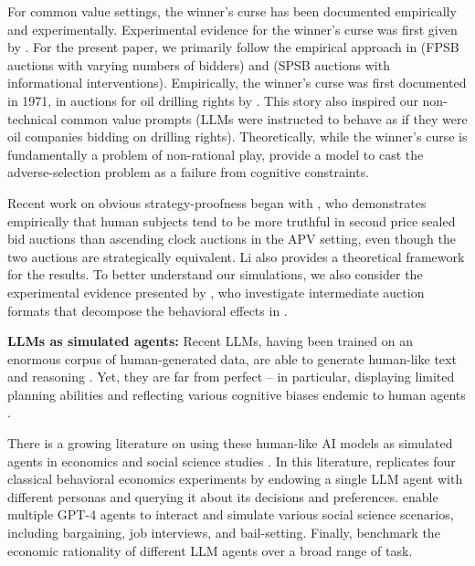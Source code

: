 \documentclass{article} %
\begin{document}
For common value settings, the winner's curse has been documented empirically and experimentally. Experimental evidence for the winner's curse was first given by \citet{bazerman1983won}. For the present paper, we primarily follow the empirical approach in \citet{kagel1986winner} (FPSB auctions with varying numbers of bidders) and \citet{kagel1987information} (SPSB auctions with informational interventions). Empirically, the winner's curse was first documented in 1971, in auctions for oil drilling rights by \cite{capen1971competitive}. This story also inspired our non-technical common value prompts (LLMs were instructed to behave as if they were oil companies bidding on drilling rights). Theoretically, while the winner's curse is fundamentally a problem of non-rational play,  \citet{charness2009origin} provide a model to cast the adverse-selection problem as a failure from cognitive constraints. 


Recent work on obvious strategy-proofness began with \citet{li2017obviously}, who demonstrates empirically that human subjects tend to be more truthful in second price sealed bid auctions than ascending clock auctions in the APV setting, even though the two auctions are strategically equivalent. Li also provides a theoretical framework for the results. To better understand our simulations, we also consider the experimental evidence presented by \citet{breitmoser2022obviousness}, who investigate intermediate auction formats that decompose the behavioral effects in \cite{li2017obviously}.

\textbf{LLMs as simulated agents:} Recent LLMs, having been trained on an enormous corpus of human-generated data, are able to generate human-like text and reasoning \cite{achiam2023gpt, bubeck2023sparks}. Yet, they are far from perfect -- in particular, displaying limited planning abilities and reflecting various cognitive biases endemic to human agents \cite{wan2023kelly}. 

There is a growing literature on using these human-like AI models as simulated agents in economics and social science studies \cite{aher2023using, park2023generative, brand2023using, raman2024steerassessingeconomicrationality}. 
In this literature, \citet{horton2023large} replicates four classical behavioral economics experiments by endowing a single LLM agent with different personas and querying it about its decisions and preferences.
\citet{manning2024automated} enable multiple GPT-4 agents to interact and simulate various social science scenarios, including bargaining, job interviews, and bail-setting.
Finally, \cite{raman2024steerassessingeconomicrationality} benchmark the economic rationality of different LLM agents over a broad range of task.
\end{document}

